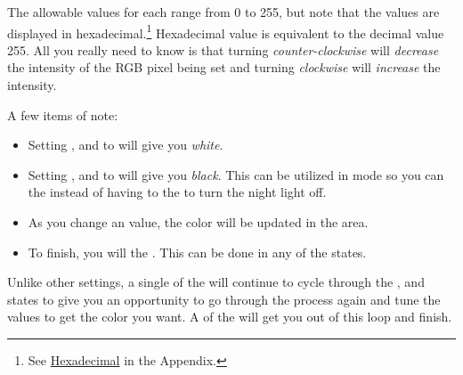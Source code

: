 The allowable values for each range from \num{0} to \num{255}, but note that
the values are displayed in hexadecimal.\footnote{ See
\hyperref[Hexadecimal]{Hexadecimal} in the Appendix.} Hexadecimal value
 is equivalent to the decimal value \num{255}. All you really need to
know is that turning \textit{counter-clockwise} will \textit{decrease} the
intensity of the RGB pixel being set and turning \textit{clockwise} will
\textit{increase} the intensity.

\par\medskip

A few items of note:

\begin{itemize}
  \item Setting ,  and  to  will give you
    \textit{white}.
  \item Setting ,  and  to  will give you
    \textit{black}.  This can be utilized in  mode so you can 
    the  instead of having to  the  to turn the night
    light off.
  \item As you change an  value, the color will be updated in the
     area.
  \item To finish, you will  the .  This can be done in any of the
     states.
\end{itemize}

Unlike other settings, a single  of the  will continue to cycle
through the ,  and  states to give you an opportunity
to go through the process again and tune the values to get the color you want.  A
 of the  will get you out of this loop and finish.

\par\medskip



